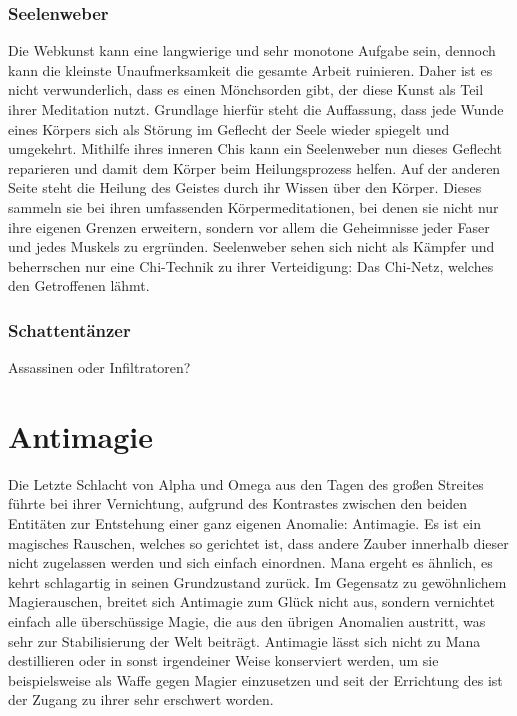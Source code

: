 \documentclass[a4paper,12pt,oneside]{book}
\begin{document}
\subsection{Seelenweber}
Die Webkunst kann eine langwierige und sehr monotone Aufgabe sein, dennoch kann die kleinste Unaufmerksamkeit die gesamte Arbeit ruinieren. Daher ist es nicht verwunderlich, dass es einen Mönchsorden gibt, der diese Kunst als Teil ihrer Meditation nutzt. Grundlage hierfür steht die Auffassung, dass jede Wunde eines Körpers sich als Störung im Geflecht der Seele wieder spiegelt und umgekehrt. Mithilfe ihres inneren Chis kann ein Seelenweber nun dieses Geflecht reparieren und damit dem Körper beim Heilungsprozess helfen. Auf der anderen Seite steht die Heilung des Geistes durch ihr Wissen über den Körper. Dieses sammeln sie bei ihren umfassenden Körpermeditationen, bei denen sie nicht nur ihre eigenen Grenzen erweitern, sondern vor allem die Geheimnisse jeder Faser und jedes Muskels zu ergründen. Seelenweber sehen sich nicht als Kämpfer und beherrschen nur eine Chi-Technik zu ihrer Verteidigung: Das Chi-Netz, welches den Getroffenen lähmt.

\subsection{Schattentänzer}
Assassinen oder Infiltratoren?


\chapter{Antimagie}\label{Antimagie}
Die Letzte Schlacht von Alpha und Omega aus den Tagen des großen Streites führte bei ihrer Vernichtung, aufgrund des Kontrastes zwischen den beiden Entitäten zur Entstehung einer ganz eigenen Anomalie: Antimagie. Es ist ein magisches Rauschen, welches so gerichtet ist, dass andere Zauber innerhalb dieser nicht zugelassen werden und sich einfach einordnen. Mana ergeht es ähnlich, es kehrt schlagartig in seinen Grundzustand zurück. Im Gegensatz zu gewöhnlichem Magierauschen, breitet sich Antimagie zum Glück nicht aus, sondern vernichtet einfach alle überschüssige Magie, die aus den übrigen Anomalien austritt, was sehr zur Stabilisierung der Welt beiträgt. Antimagie lässt sich nicht zu Mana destillieren oder in sonst irgendeiner Weise konserviert werden, um sie beispielsweise als Waffe gegen Magier einzusetzen und seit der Errichtung des  ist der Zugang zu ihrer sehr erschwert worden. 
\end{document}
